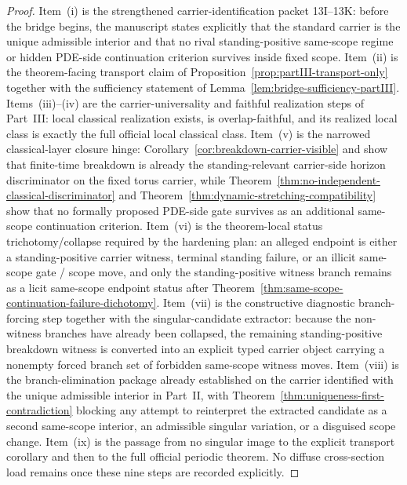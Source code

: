 \begin{proof}
Item~(i) is the strengthened carrier-identification packet 13I--13K: before the bridge begins, the manuscript states explicitly that the standard carrier is the unique admissible interior and that no rival standing-positive same-scope regime or hidden PDE-side continuation criterion survives inside fixed scope. Item~(ii) is the theorem-facing transport claim of Proposition~\ref{prop:partIII-transport-only} together with the sufficiency statement of Lemma~\ref{lem:bridge-sufficiency-partIII}. Items~(iii)--(iv) are the carrier-universality and faithful realization steps of Part~III: local classical realization exists, is overlap-faithful, and its realized local class is exactly the full official local classical class. Item~(v) is the narrowed classical-layer closure hinge: Corollary~\ref{cor:breakdown-carrier-visible} and \HorizonDetectabilityRef{} show that finite-time breakdown is already the standing-relevant carrier-side horizon discriminator on the fixed torus carrier, while Theorem~\ref{thm:no-independent-classical-discriminator} and Theorem~\ref{thm:dynamic-stretching-compatibility} show that no formally proposed PDE-side gate survives as an additional same-scope continuation criterion. Item~(vi) is the theorem-local status trichotomy/collapse required by the hardening plan: an alleged endpoint is either a standing-positive carrier witness, terminal standing failure, or an illicit same-scope gate / scope move, and only the standing-positive witness branch remains as a licit same-scope endpoint status after Theorem~\ref{thm:same-scope-continuation-failure-dichotomy}. Item~(vii) is the constructive diagnostic branch-forcing step together with the singular-candidate extractor: because the non-witness branches have already been collapsed, the remaining standing-positive breakdown witness is converted into an explicit typed carrier object carrying a nonempty forced branch set of forbidden same-scope witness moves. Item~(viii) is the branch-elimination package already established on the carrier identified with the unique admissible interior in Part~II, with Theorem~\ref{thm:uniqueness-first-contradiction} blocking any attempt to reinterpret the extracted candidate as a second same-scope interior, an admissible singular variation, or a disguised scope change. Item~(ix) is the passage from no singular image to the explicit transport corollary and then to the full official periodic theorem. No diffuse cross-section load remains once these nine steps are recorded explicitly.
\end{proof}

